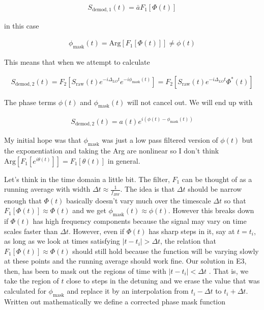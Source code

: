 \documentclass[12pt]{article}
\begin{document}
\begin{align}
S_{\text{demod},1}(t) = \bar{a}F_1\left[\Phi(t)\right]
\end{align}

in this case 

\begin{align}
\phi_{\text{mask}}(t) = \text{Arg}\left[F_1[\Phi(t)]\right] \neq \phi(t)
\end{align}

This means that when we attempt to calculate

\begin{align}
S_{\text{demod},2}(t) = F_2\left[S_{\text{raw}}(t) e^{-i\Delta_{LO} t} e^{-i\phi_{\text{mask}}(t)} \right] = F_2\left[S_{\text{raw}}(t) e^{-i\Delta_{LO} t} \Phi^*(t) \right] 
\end{align}

The phase terms $\phi(t)$ and $\phi_{\text{mask}}(t)$ will not cancel out. We will end up with

\begin{align}
S_{\text{demod},2}(t) = a(t) e^{i(\phi(t)-\phi_{\text{mask}}(t))}
\end{align}

My initial hope was that $\phi_{\text{mask}}$ was just a low pass filtered version of $\phi(t)$ but the exponentiation and taking the Arg are nonlinear so I don't think $\text{Arg}[F_1[e^{i\theta(t)}]] = F_1[\theta(t)]$ in general.


Let's think in the time domain a little bit. The filter, $F_1$ can be thought of as a running average with width $\Delta t \approx \frac{1}{f_{BW}}$. The idea is that $\Delta t$ should be narrow enough that $\Phi(t)$ basically doesn't vary much over the timescale $\Delta t$ so that $F_1[\Phi(t)] \approx \Phi(t)$ and we get $\phi_{\text{mask}}(t) \approx \phi(t)$. However this breaks down if $\Phi(t)$ has high frequency components because the signal may vary on time scales faster than $\Delta t$. However, even if $\Phi(t)$ has sharp steps in it, say at $t = t_i$, as long as we look at times satisfying $|t-t_i|>\Delta t$, the relation that $F_1[\Phi(t)] \approx \Phi(t)$ should still hold because the function will be varying slowly at these points and the running average should work fine. Our solution in E3, then, has been to mask out the regions of time with $|t-t_i|<\Delta t$ . That is, we take the region of $t$ close to steps in the detuning and we erase the value that was calculated for $\phi_{\text{mask}}$ and replace it by an interpolation from $t_i-\Delta t$ to $t_i+\Delta t$. Written out mathematically we define a corrected phase mask function
\end{document}
